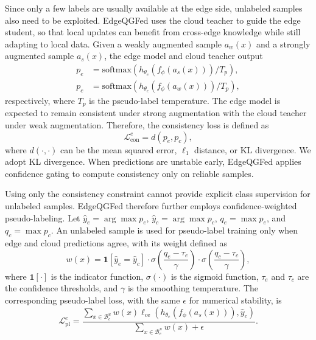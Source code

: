 ﻿\documentclass[10pt, conference, letterpaper]{ IEEEtran}
\begin{document}
Since only a few labels are usually available at the edge side, unlabeled samples also need to be exploited. EdgeQGFed uses the cloud teacher to guide the edge student, so that local updates can benefit from cross-edge knowledge while still adapting to local data. Given a weakly augmented sample $a_w(x)$ and a strongly augmented sample $a_s(x)$, the edge model and cloud teacher output
\begin{align}
    p_e &= \mathrm{softmax}\left(h_{\theta_e}(f_\phi(a_s(x)))/T_p\right), \nonumber\\
    p_c &= \mathrm{softmax}\left(h_{\theta_c}(f_\phi(a_w(x)))/T_p\right),
    \label{eq:edge_cloud_pred}
\end{align}
respectively, where $T_p$ is the pseudo-label temperature. The edge model is expected to remain consistent under strong augmentation with the cloud teacher under weak augmentation. Therefore, the consistency loss is defined as
\begin{equation}
    \mathcal{L}_{\mathrm{con}}^e =
    d(p_e,p_c),
    \label{eq:consistency_loss}
\end{equation}
where $d(\cdot,\cdot)$ can be the mean squared error, $\ell_1$ distance, or KL divergence. We adopt KL divergence. When predictions are unstable early, EdgeQGFed applies confidence gating to compute consistency only on reliable samples.

Using only the consistency constraint cannot provide explicit class supervision for unlabeled samples. EdgeQGFed therefore further employs confidence-weighted pseudo-labeling. Let $\hat{y}_e=\arg\max p_e$, $\hat{y}_c=\arg\max p_c$, $q_e=\max p_e$, and $q_c=\max p_c$. An unlabeled sample is used for pseudo-label training only when edge and cloud predictions agree, with its weight defined as
\begin{equation}
    w(x) =
    \mathbf{1}[\hat{y}_e=\hat{y}_c]
    \cdot
    \sigma\left(\frac{q_e-\tau_e}{\gamma}\right)
    \cdot
    \sigma\left(\frac{q_c-\tau_c}{\gamma}\right),
    \label{eq:pseudo_weight}
\end{equation}
where $\mathbf{1}[\cdot]$ is the indicator function, $\sigma(\cdot)$ is the sigmoid function, $\tau_e$ and $\tau_c$ are the confidence thresholds, and $\gamma$ is the smoothing temperature. The corresponding pseudo-label loss, with the same $\epsilon$ for numerical stability, is
\begin{equation}
    \mathcal{L}_{\mathrm{pl}}^e =
    \frac{\sum_{x\in\mathcal{B}_e^u} w(x)
    \ell_{\mathrm{ce}}\left(h_{\theta_e}(f_\phi(a_s(x))), \hat{y}_c\right)}
    {\sum_{x\in\mathcal{B}_e^u} w(x)+\epsilon}.
    \label{eq:pseudo_loss}
\end{equation}
\end{document}
